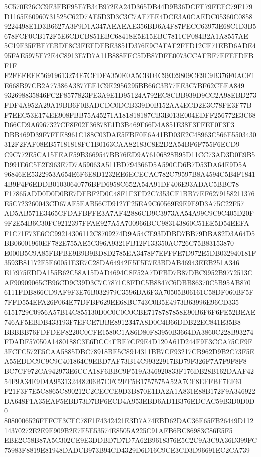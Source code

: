 \documentclass[UTF8,fontset=fandol,zihao=-4,a4paper]{ctexart}
\begin{document}
{{5C570E26CC9F3FBF95E7B34B972EA24D365DB44D9B36DCFF79FEFC79F179D1165E60960731525C62D7AE5D3D3C3C7AF7EE4DCE3A0CAEDC05360C0858
9224498E1D3B6627A3F9D1A347AEAEAE356BD6A4F87FECC63973E68C1D3B5678FCF0CB172F5E6CDCB851EBC68418E5E15EBC7811CF084B2A1A8557AE
5C19F35FBF7EBDF8C3FEFDFBE3851D376E9CAFAF2FFD12CF71EBD6ADE495FAE5975F72E4C8913E7D7A11B888FFC5DB87DFE0073CCAFBF7EFEFDFBF1F
F2FEFEFE56919613274E7CFDFA350E0A5CBD4C99329809CE9C9B376F0ACF1E668B97CB2A77386A3877EE1C9E2956295BB66C3B77EE3C7BF62CEEA849
932698835846FC2F8577823FE3A9E1D95124A792EC8CBB939D9CC2A98EBD273FDF4A952A29A19BB6F0BADCDC0DCB339D0B152AA4ECD2E3C78FE3F77B
F7EEC53E174EE908FBB75A45271A181818187CB3B013E004EDFF256772E3C68D66CD9A6967327CF8F02F36878E1D3B469F66D4A851E38F3FFEF0F3F3
DBB469D39F7FFE8961C188C03DAE5FBF0E6A41BD03E2C48963C566E5503430312F2FAF08EB57181818FC1B0163CAA82183C8E2D2A54BF6F755F6ECD9
C9C772E5CA15FEAF59B3669547BB76ED9A76106828B95D11CC73AD3D0E9B5D991E6C5E2E963E7D7A59063A511BD794366D5A590CD6B7D53DA64E9D5A
96846EE5322953A654E6F6E8D1232EE6ECECAC782C79597B8A4594C5B4F18414B9F4F6EDDB01030640776BFD6958C652A54A91DF406E93ADAC5BBC78
F17865ADD0D0D0BE7DFBF2D0C48F1F3FD2C7353CF1BB77EF6279158211376E5C723260043CD67AF5EAB56CD9127F25EA9C60569E9E9E9D3A75C22F57
AD5AB571E3465CFDAFBFFE3A7AF42886CD9C3973AA54A99C9C9C405D20F9F2E54B6C30FC9212397FFAE927A5A700966BCC983143860C51EE5D54EEFA
F1C71F73E6CC99214306112C8709274D9A54CE93DDBD7BB79DBA82D3A64D5BB06001960EF782E755AE5C396A9321FB12F133350AC726C75B83153870
E000B5C9A85FBFBE9B9B9BD8D2785EA3478F7EFFFE7D972E5DB032940181F3593B81172F5E60051E3E7C28DA64942F5F5E7E3BDAB46943EEB251A346
E17975EDDA155B62C58A15DAD4694C8F52A7DFBD7B87DBC9952B9772513CAF90909065CB96CD9C39D3C7C7871C8FDC5B8847C6DBB86370C5B95AB870
6111FDB866CD9AF9F3E76B032979C3596DA6F3A70505B06161C58DF060BF5F7FFD554EFA26F064E77DFBF629EE68BC743C0B5E4973B63996E96CD335
6151729C0956A57B14C855130D0C0C0C0CBE7178787858E90B6F6F6FE52BEAE746AF5EBDB433193F7EFCE7BBE8912347A8D0C4B66DDB22EC841E35B8
BBBBB76FDFDEF8220C0CFE1580C1A86D80F83950B3664DA3860C228B93274FDADF57050A1480188C3E6DCC4FBE7CF9E4D120A61D244F9E3CCA75CF9F
3FCFC572E5CAA5885DBC78918BE5C8914311BB7CF93217CB962D9B2C73F5EA55EDDC9C9C9C401864C9EBD7AF73B14C99322917BD79F326F7A7F9F8F8
BC7CF972CA942973E6CCA18F6BBC9F519A346920833F176DB28B162DAAF4254F9A34E9D4A953132448206B7CFC2FF5B1757575A52A7CF8EFFBF7EF61
F21F3F7E5C8865C890212C2CECCE9D3B870E1DA2A1A831E88B172F9A346922DA648F1A35EAF5EBD73D7BF6ECD4A953EBD6AD1B376EDCAC59B3D0D0D0
8080006526FFFCF3CFC78F1F4342421E3D7A74EBD62DAC36E65FB26449D11214370272E2E9E909B2E7E5E53574E8505A225C91AFB6BC86983C86E5F5
EBE2C58B87A5C302CE9E3DDBD7D7D7A62B9618376E5C2C9A3C9A36D399FC75983F8819E81948DADCB973B94CD4329D6D16C9CE3CD3D96691EC2CA739
}}
\end{document}
